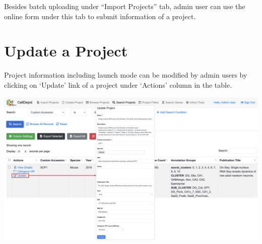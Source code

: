 \documentclass[
  openany]{book}
\begin{document}
Besides batch uploading under ``Import Projects'' tab, admin user can use the online form under this tab to submit information of a project.

\hypertarget{update-a-project}{%
\section{Update a Project}\label{update-a-project}}

Project information including launch mode can be modified by admin users by clicking on `Update' link of a project under `Actions' column in the table.

\href{https://interactivereport.github.io/CellDepot/bookdown/figures/S11.jpg}{\includegraphics{figures/S11.jpg}}

  
\end{document}
